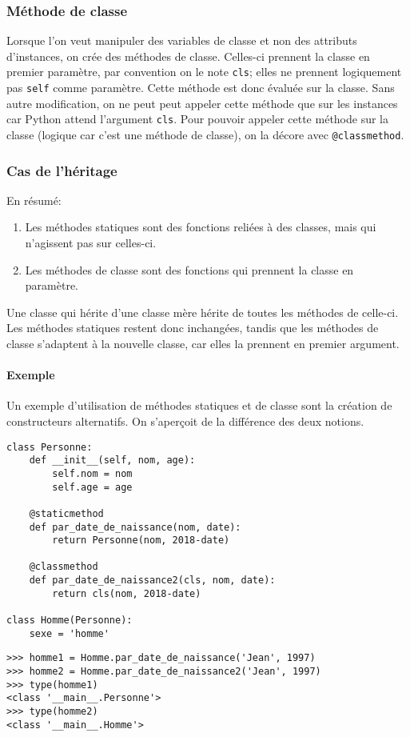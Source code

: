\subsubsection{Méthode de classe}
\label{sec:classmethod}
Lorsque l'on veut manipuler des variables de classe et non des attributs d'instances, on crée des méthodes de classe. Celles-ci prennent la classe en premier paramètre, par convention on le note \texttt{cls}; elles ne prennent logiquement pas \texttt{self} comme paramètre. Cette méthode est donc évaluée sur la classe. Sans autre modification, on ne peut peut appeler cette méthode que sur les instances car Python attend l'argument \texttt{cls}. Pour pouvoir appeler cette méthode sur la classe (logique car c'est une méthode de classe), on la décore avec \texttt{@classmethod}.

\subsubsection{Cas de l'héritage}
En résumé:
\begin{enumerate}
        \item Les méthodes statiques sont des fonctions reliées à des classes, mais qui n'agissent pas sur celles-ci.
        \item Les méthodes de classe sont des fonctions qui prennent la classe en paramètre.
\end{enumerate}

Une classe qui hérite d'une classe mère hérite de toutes les méthodes de celle-ci. Les méthodes statiques restent donc inchangées, tandis que les méthodes de classe s'adaptent à la nouvelle classe, car elles la prennent en premier argument.

\paragraph{Exemple} Un exemple d'utilisation de méthodes statiques et de classe sont la création de constructeurs alternatifs. On s'aperçoit de la différence des deux notions.
\begin{verbatim}
class Personne:
    def __init__(self, nom, age):
        self.nom = nom
        self.age = age

    @staticmethod
    def par_date_de_naissance(nom, date):
        return Personne(nom, 2018-date)

    @classmethod
    def par_date_de_naissance2(cls, nom, date):
        return cls(nom, 2018-date)

class Homme(Personne):
    sexe = 'homme'
\end{verbatim}
\begin{verbatim}
>>> homme1 = Homme.par_date_de_naissance('Jean', 1997)
>>> homme2 = Homme.par_date_de_naissance2('Jean', 1997)
>>> type(homme1)
<class '__main__.Personne'>
>>> type(homme2)
<class '__main__.Homme'>
\end{verbatim}

